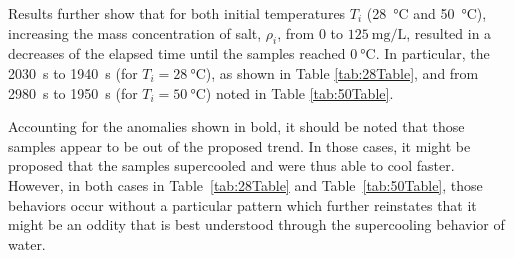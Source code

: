 \documentclass[../main.tex]{subfiles}
\begin{document}
Results further show that for both initial temperatures $T_i$ (\SI{28}{\celsius} and \SI{50}{\celsius}), increasing the mass concentration of salt, $\rho_i$, from $0$ to $\SI{125}{\milli\gram\per\liter}$, resulted in a decreases of the elapsed time until the samples reached $\SI{0}{\celsius}$. In particular, the \SI{2030}{\second} to \SI{1940}{\second} (for $T_i = \SI{28}{\celsius}$), as shown in Table \ref{tab:28Table}, and from \SI{2980}{\second} to \SI{1950}{\second} (for $T_i = \SI{50}{\celsius}$) noted in Table \ref{tab:50Table}. \par

Accounting for the anomalies shown in bold, it should be noted that those samples appear to be out of the proposed trend. In those cases, it might be proposed that the samples supercooled and were thus able to cool faster. However, in both cases in Table~\ref{tab:28Table} and Table~\ref{tab:50Table}, those behaviors occur without a particular pattern which further reinstates that it might be an oddity that is best understood through the supercooling behavior of water. \par
\end{document}
